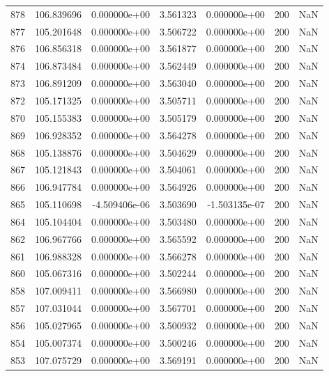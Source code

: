 \begin{tabular}{rrrrrrr}
 878 & 106.839696 &  0.000000e+00 &  3.561323 &  0.000000e+00 &         200 & NaN \\
 877 & 105.201648 &  0.000000e+00 &  3.506722 &  0.000000e+00 &         200 & NaN \\
 876 & 106.856318 &  0.000000e+00 &  3.561877 &  0.000000e+00 &         200 & NaN \\
 874 & 106.873484 &  0.000000e+00 &  3.562449 &  0.000000e+00 &         200 & NaN \\
 873 & 106.891209 &  0.000000e+00 &  3.563040 &  0.000000e+00 &         200 & NaN \\
 872 & 105.171325 &  0.000000e+00 &  3.505711 &  0.000000e+00 &         200 & NaN \\
 870 & 105.155383 &  0.000000e+00 &  3.505179 &  0.000000e+00 &         200 & NaN \\
 869 & 106.928352 &  0.000000e+00 &  3.564278 &  0.000000e+00 &         200 & NaN \\
 868 & 105.138876 &  0.000000e+00 &  3.504629 &  0.000000e+00 &         200 & NaN \\
 867 & 105.121843 &  0.000000e+00 &  3.504061 &  0.000000e+00 &         200 & NaN \\
 866 & 106.947784 &  0.000000e+00 &  3.564926 &  0.000000e+00 &         200 & NaN \\
 865 & 105.110698 & -4.509406e-06 &  3.503690 & -1.503135e-07 &         200 & NaN \\
 864 & 105.104404 &  0.000000e+00 &  3.503480 &  0.000000e+00 &         200 & NaN \\
 862 & 106.967766 &  0.000000e+00 &  3.565592 &  0.000000e+00 &         200 & NaN \\
 861 & 106.988328 &  0.000000e+00 &  3.566278 &  0.000000e+00 &         200 & NaN \\
 860 & 105.067316 &  0.000000e+00 &  3.502244 &  0.000000e+00 &         200 & NaN \\
 858 & 107.009411 &  0.000000e+00 &  3.566980 &  0.000000e+00 &         200 & NaN \\
 857 & 107.031044 &  0.000000e+00 &  3.567701 &  0.000000e+00 &         200 & NaN \\
 856 & 105.027965 &  0.000000e+00 &  3.500932 &  0.000000e+00 &         200 & NaN \\
 854 & 105.007374 &  0.000000e+00 &  3.500246 &  0.000000e+00 &         200 & NaN \\
 853 & 107.075729 &  0.000000e+00 &  3.569191 &  0.000000e+00 &         200 & NaN \\

\end{tabular}

